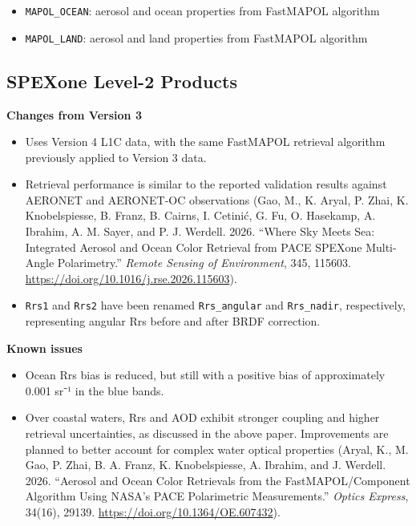 \documentclass[
  11pt,
  letterpaper,
]{scrreprt}
\providecommand{\tightlist}{%
  \setlength{\itemsep}{0pt}\setlength{\parskip}{0pt}}
\begin{document}
\begin{itemize}
\tightlist
\item
  \texttt{MAPOL\_OCEAN}: aerosol and ocean properties from FastMAPOL
  algorithm
\item
  \texttt{MAPOL\_LAND}: aerosol and land properties from FastMAPOL
  algorithm
\end{itemize}

\subsection*{SPEXone Level-2 Products}\label{spexone-level-2-products}

\textbf{Changes from Version 3}

\begin{itemize}
\item
  Uses Version 4 L1C data, with the same FastMAPOL retrieval algorithm
  previously applied to Version 3 data.
\item
  Retrieval performance is similar to the reported validation results
  against AERONET and AERONET-OC observations (Gao, M., K. Aryal, P.
  Zhai, K. Knobelspiesse, B. Franz, B. Cairns, I. Cetinić, G. Fu, O.
  Hasekamp, A. Ibrahim, A. M. Sayer, and P. J. Werdell. 2026. ``Where
  Sky Meets Sea: Integrated Aerosol and Ocean Color Retrieval from PACE
  SPEXone Multi-Angle Polarimetry.'' \emph{Remote Sensing of
  Environment}, 345, 115603.
  \url{https://doi.org/10.1016/j.rse.2026.115603}).
\item
  \texttt{Rrs1} and \texttt{Rrs2} have been renamed
  \texttt{Rrs\_angular} and \texttt{Rrs\_nadir}, respectively,
  representing angular Rrs before and after BRDF correction.
\end{itemize}

\textbf{Known issues}

\begin{itemize}
\item
  Ocean Rrs bias is reduced, but still with a positive bias of
  approximately 0.001 sr⁻¹ in the blue bands.
\item
  Over coastal waters, Rrs and AOD exhibit stronger coupling and higher
  retrieval uncertainties, as discussed in the above paper. Improvements
  are planned to better account for complex water optical properties
  (Aryal, K., M. Gao, P. Zhai, B. A. Franz, K. Knobelspiesse, A.
  Ibrahim, and J. Werdell. 2026. ``Aerosol and Ocean Color Retrievals
  from the FastMAPOL/Component Algorithm Using NASA's PACE Polarimetric
  Measurements.'' \emph{Optics Express}, 34(16), 29139.
  \url{https://doi.org/10.1364/OE.607432}).
\end{itemize}
\end{document}

